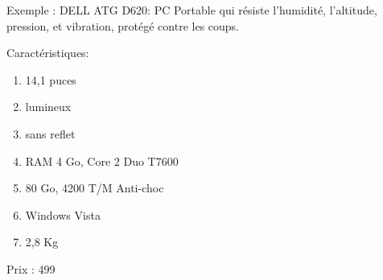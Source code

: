\documentclass[a4paper]{article}
\begin{document}
Exemple : DELL ATG D620: PC Portable qui résiste l'humidité, l'altitude,
pression, et vibration, protégé contre les coups.
	
	Caractéristiques:

	\begin{enumerate} \item 14,1 puces \item lumineux \item sans reflet
	\item RAM 4 Go, Core 2 Duo T7600 \item 80 Go, 4200 T/M Anti-choc
	\item Windows Vista \item 2,8 Kg \end{enumerate}

Prix : 499 \euros 
\end{document}
